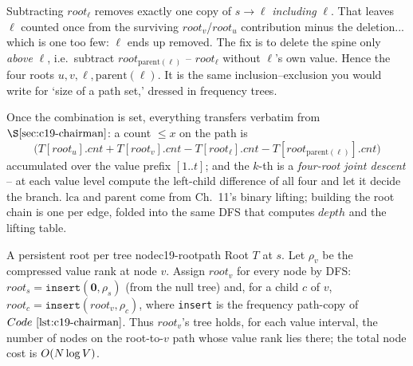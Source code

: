 Subtracting \(\mathit{root}_\ell\) removes exactly one copy of \(s\to\ell\) \emph{including} \(\ell\). That leaves \(\ell\) counted once from the surviving \(\mathit{root}_v\)/\(\mathit{root}_u\) contribution minus the deletion... which is one too few: \(\ell\) ends up removed. The fix is to delete the spine only \emph{above} \(\ell\), i.e.\ subtract \(\mathit{root}_{\mathrm{parent}(\ell)}\) -- \(\mathit{root}_\ell\) without \(\ell\)'s own value. Hence the four roots \(u,v,\ell,\mathrm{parent}(\ell)\). It is the same inclusion--exclusion you would write for `size of a path set,' dressed in frequency trees.

Once the combination is set, everything transfers verbatim from \(\secref{c19-chairman}\): a count \(\le x\) on the path is
\[
  \bigl(T[\mathit{root}_u].\mathit{cnt}+T[\mathit{root}_v].\mathit{cnt}-T[\mathit{root}_\ell].\mathit{cnt}-T[\mathit{root}_{\mathrm{parent}(\ell)}].\mathit{cnt}\bigr)
\]
accumulated over the value prefix \([1..t]\); and the \(k\)-th is a \emph{four-root joint descent} -- at each value level compute the left-child difference of all four and let it decide the branch. \(\mathrm{lca}\) and \(\mathrm{parent}\) come from Ch.~11's binary lifting; building the root chain is one  per edge, folded into the same DFS that computes \(\mathit{depth}\) and the lifting table.

\begin{definition}{A persistent root per tree node}{c19-rootpath}
Root \(T\) at \(s\). Let \(\rho_v\) be the compressed value rank at node \(v\). Assign \(\mathit{root}_v\) for every node by DFS: \(\mathit{root}_s=\texttt{insert}(\mathbf{0},\rho_s)\) (from the null tree) and, for a child \(c\) of \(v\), \(\mathit{root}_c=\texttt{insert}(\mathit{root}_v,\rho_c)\), where \texttt{insert} is the frequency path-copy of \(\coderef{c19-chairman}\). Thus \(\mathit{root}_v\)'s tree holds, for each value interval, the number of nodes on the root-to-\(v\) path whose value rank lies there; the total node cost is \(O(N\log V)\).
\end{definition}

